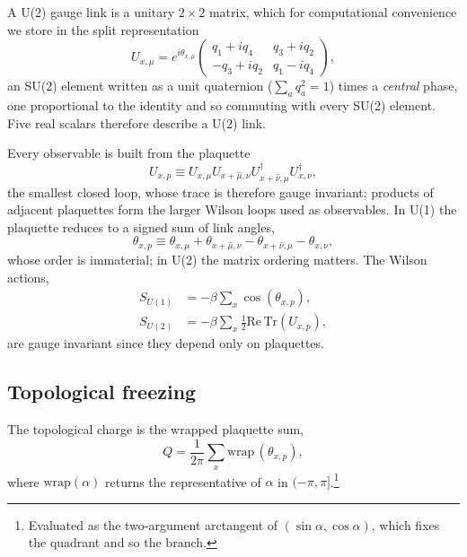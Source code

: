 \documentclass[prd, twocolumn, superscriptaddress, nofootinbib,floatfix]{revtex4-2}
\begin{document}
A U(2) gauge link is a unitary $2\times2$ matrix, which for computational convenience we
store in the split representation
\begin{equation}
    U_{x,\mu} = e^{i\theta_{x,\mu}}\begin{pmatrix}
q_1 + i q_4 & q_3 + i q_2 \\
-q_3 + i q_2 & q_1 - i q_4
\end{pmatrix},
    \label{eq:u2-link}
\end{equation}
an SU(2) element written as a unit quaternion ($\sum_a q_a^2 = 1$) times a
\emph{central} phase, one proportional to the identity and so commuting with
every SU(2) element. Five real scalars therefore describe a U(2) link.

Every observable is built from the plaquette
\begin{equation}
    U_{x,p} \equiv U_{x,\mu} U_{x+\hat{\mu},\nu} U_{x+\hat{\nu},\mu}^\dagger U_{x,\nu}^\dagger,
    \label{eq:plaquette}
\end{equation}
the smallest closed loop, whose trace is therefore gauge invariant; products of adjacent
plaquettes form the larger Wilson loops used as observables. In U(1) the
plaquette reduces to a signed sum of link angles,
\begin{equation}
    \theta_{x,p} \equiv \theta_{x,\mu} + \theta_{x+\hat{\mu},\nu} - \theta_{x+\hat{\nu},\mu} - \theta_{x,\nu},
    \label{eq:theta-plaquette}
\end{equation}
whose order is immaterial; in U(2) the matrix ordering matters. The Wilson
actions,
\begin{align}
    S_{U(1)} &= -\beta \sum_{x}\cos(\theta_{x,p}), \label{eq:action-u1}\\
    S_{U(2)} &= -\beta \sum_{x} \tfrac{1}{2}\mathrm{Re}\,\mathrm{Tr}(U_{x,p}),
    \label{eq:action-u2}
\end{align}
are gauge invariant since they depend only on plaquettes.

\subsection{Topological freezing}
\label{sec:freezing}

The topological charge is the wrapped plaquette sum,
\begin{equation}
    Q = \frac{1}{2\pi}\sum_{x} \mathrm{wrap}\,(\theta_{x,p}),
    \label{eq:q-u1}
\end{equation}
where $\mathrm{wrap}(\alpha)$ returns the representative of $\alpha$ in
$(-\pi,\pi]$.\footnote{Evaluated as the two-argument arctangent of
$(\sin\alpha,\cos\alpha)$, which fixes the quadrant and so the branch.}
\end{document}
